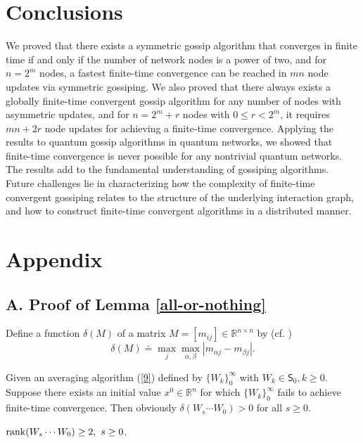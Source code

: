 \documentclass[a4paper, 11pt]{article}
\begin{document}
\section{Conclusions}\label{Sec:Conclusions}
We proved  that there exists a symmetric gossip algorithm that converges in finite time if and only if the number of network nodes is a power of two, and for $n=2^m$ nodes,  a fastest finite-time convergence can be reached in $mn$ node updates via symmetric gossiping. We also proved that there always exists a globally finite-time convergent gossip algorithm for any number of nodes with asymmetric updates, and for $n=2^m+r$ nodes with $0\leq r<2^m$, it requires $mn+2r$ node updates for achieving a finite-time convergence. Applying the results to quantum  gossip algorithms in quantum networks, we showed  that finite-time convergence is never possible for any nontrivial quantum networks. The results add to the  fundamental understanding of  gossiping algorithms. Future challenges lie in characterizing how the complexity of finite-time convergent gossiping relates to the structure of the underlying interaction graph, and how to construct  finite-time convergent  algorithms in a distributed manner.


\medskip

\medskip
\section*{Appendix}

\subsection*{A. Proof of Lemma \ref{all-or-nothing}}

Define a function $\delta(M)$ of a matrix $M=[m_{ij}]\in \mathbb{R}^{n\times n}$ by (cf. \cite{Hajnal1958})
\begin{equation}
\delta (M)\doteq\max_j \max_{\alpha, \beta}|m_{\alpha j}-m_{\beta j}|.
\end{equation}

Given an averaging algorithm (\ref{9}) defined by $\{W_k\}_0^\infty$ with $W_k\in \mathsf{S}_0,k\geq0$. Suppose there exists an initial value $x^0\in\mathbb{R}^n$ for which $\{W_k\}_0^\infty$ fails to achieve finite-time convergence. Then  obviously $\delta(W_s\cdots W_0)>0$ for all $s\geq0$.

\vspace{2mm}
 ${\rm rank}(W_s\cdots W_0)\geq2,\ s\geq0$.
\end{document}
